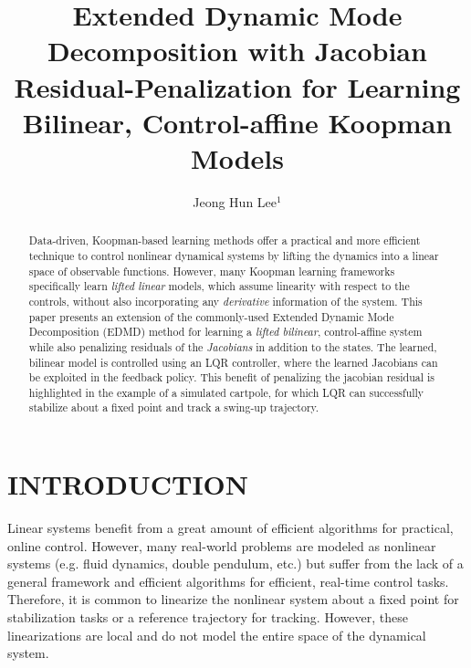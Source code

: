 \documentclass[letterpaper, 10 pt, conference]{ieeeconf}  %
\title{\LARGE \bf
Extended Dynamic Mode Decomposition with Jacobian Residual-Penalization for Learning Bilinear, Control-affine Koopman Models
}
\author{Jeong Hun Lee$^{1}$ %
}
\begin{document}
\maketitle
\thispagestyle{empty}
\pagestyle{empty}

\begin{abstract}

Data-driven, Koopman-based learning methods offer a practical and more efficient technique to control nonlinear dynamical systems by lifting the dynamics into a linear space of observable functions. However, many Koopman learning frameworks specifically learn \emph{lifted linear} models, which assume linearity with respect to the controls, without also incorporating any \emph{derivative} information of the system. This paper presents an extension of the commonly-used Extended Dynamic Mode Decomposition (EDMD) method for learning a \emph{lifted bilinear}, control-affine system while also penalizing residuals of the \emph{Jacobians} in addition to the states. The learned, bilinear model is controlled using an LQR controller, where the learned Jacobians can be exploited in the feedback policy. This benefit of penalizing the jacobian residual is highlighted in the example of a simulated cartpole, for which LQR can successfully stabilize about a fixed point and track a swing-up trajectory.

\end{abstract}

\section{INTRODUCTION}

Linear systems benefit from a great amount of efficient algorithms for practical, online control. However, many real-world problems are modeled as nonlinear systems (e.g. fluid dynamics, double pendulum, etc.) but suffer from the lack of a general framework and efficient algorithms for efficient, real-time control tasks. Therefore, it is common to linearize the nonlinear system about a fixed point for stabilization tasks or a reference trajectory for tracking. However, these linearizations are local and do not model the entire space of the dynamical system.
\end{document}
